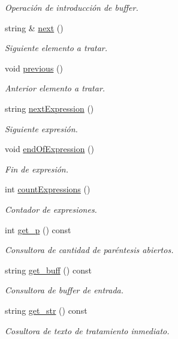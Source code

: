 \begin{DoxyCompactItemize}
\begin{DoxyCompactList}\small\item\em Operación de introducción de buffer. \end{DoxyCompactList}\item 
string \& \hyperlink{class_input_a46fcdbe27e719eac8de9ba6413042798}{next} ()
\begin{DoxyCompactList}\small\item\em Siguiente elemento a tratar. \end{DoxyCompactList}\item 
void \hyperlink{class_input_a8bf471815e7a4ef6f6083598bc1fe236}{previous} ()
\begin{DoxyCompactList}\small\item\em Anterior elemento a tratar. \end{DoxyCompactList}\item 
string \hyperlink{class_input_a1c8a389a2bccdcc8c6206c2fbdd6a9f8}{next\+Expression} ()
\begin{DoxyCompactList}\small\item\em Siguiente expresión. \end{DoxyCompactList}\item 
void \hyperlink{class_input_a326f5a9c81353747b9f525bb32dbc8df}{end\+Of\+Expression} ()
\begin{DoxyCompactList}\small\item\em Fin de expresión. \end{DoxyCompactList}\item 
int \hyperlink{class_input_ac9f1e2e25646ce602cf9ff83dcc563fe}{count\+Expressions} ()
\begin{DoxyCompactList}\small\item\em Contador de expresiones. \end{DoxyCompactList}\item 
int \hyperlink{class_input_a61a5b6e5b3e5d7b3022cf93ee5320a1e}{get\+\_\+p} () const 
\begin{DoxyCompactList}\small\item\em Consultora de cantidad de paréntesis abiertos. \end{DoxyCompactList}\item 
string \hyperlink{class_input_a0ac05102d9a18cffb38c149695a31b0c}{get\+\_\+buff} () const 
\begin{DoxyCompactList}\small\item\em Consultora de buffer de entrada. \end{DoxyCompactList}\item 
string \hyperlink{class_input_a1e3e0c2189a88504d8c5e440de162e77}{get\+\_\+str} () const 
\begin{DoxyCompactList}\small\item\em Cosultora de texto de tratamiento inmediato. \end{DoxyCompactList}\end{DoxyCompactItemize}
